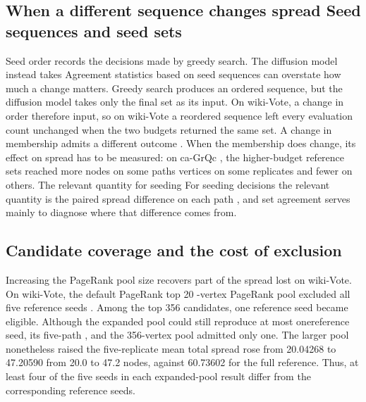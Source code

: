 \documentclass[smallextended]{svjour3}
\providecommand{\DIFaddtex}[1]{{\protect\color{blue} \sf #1}} %
\providecommand{\DIFdeltex}[1]{{\protect\color{red} \scriptsize #1}} %
\providecommand{\DIFaddbegin}{} %
\providecommand{\DIFaddend}{} %
\providecommand{\DIFdelbegin}{} %
\providecommand{\DIFdelend}{} %
\providecommand{\DIFadd}[1]{\texorpdfstring{\DIFaddtex{#1}}{#1}} %
\providecommand{\DIFdel}[1]{\texorpdfstring{\DIFdeltex{#1}}{}} %
\providecommand{\DIFscaledelfig}{0.5}
\newlength{\DIFdelgraphicswidth} %
\newlength{\DIFdelgraphicsheight} %
\providecommand{\DIFaddincludegraphics}[2][]{{\color{blue}\fbox{\DIFOincludegraphics[#1]{#2}}}} %
\providecommand{\DIFdelincludegraphics}[2][]{%
\sbox{\DIFdelgraphicsbox}{\DIFOincludegraphics[#1]{#2}}%
\settoboxwidth{\DIFdelgraphicswidth}{\DIFdelgraphicsbox} %
\settoboxtotalheight{\DIFdelgraphicsheight}{\DIFdelgraphicsbox} %
\scalebox{\DIFscaledelfig}{%
\parbox[b]{\DIFdelgraphicswidth}{\usebox{\DIFdelgraphicsbox}\\[-\baselineskip] \rule{\DIFdelgraphicswidth}{0em}}\llap{\resizebox{\DIFdelgraphicswidth}{\DIFdelgraphicsheight}{%
\setlength{\unitlength}{\DIFdelgraphicswidth}%
\begin{picture}(1,1)%
\thicklines\linethickness{2pt} %
{\color[rgb]{1,0,0}\put(0,0){\framebox(1,1){}}}%
{\color[rgb]{1,0,0}\put(0,0){\line( 1,1){1}}}%
{\color[rgb]{1,0,0}\put(0,1){\line(1,-1){1}}}%
\end{picture}%
}\hspace*{3pt}}} %
} %
\DeclareRobustCommand{\DIFaddbegin}{\DIFOaddbegin \let\includegraphics\DIFaddincludegraphics} %
\DeclareRobustCommand{\DIFaddend}{\DIFOaddend \let\includegraphics\DIFOincludegraphics} %
\DeclareRobustCommand{\DIFdelbegin}{\DIFOdelbegin \let\includegraphics\DIFdelincludegraphics} %
\DeclareRobustCommand{\DIFdelend}{\DIFOaddend \let\includegraphics\DIFOincludegraphics} %
\begin{document}
\subsection{\DIFdelbegin \DIFdel{When a different sequence changes spread}\DIFdelend \DIFaddbegin \DIFadd{Seed sequences and seed sets}\DIFaddend }
\DIFdelbegin \DIFdel{Seed order records the decisions made by greedy search. The diffusion model instead takes }\DIFdelend \DIFaddbegin \DIFadd{Agreement statistics based on seed sequences can overstate how much a change matters. Greedy search produces an ordered sequence, but the diffusion model takes only }\DIFaddend the final set as \DIFdelbegin \DIFdel{its input. On wiki-Vote, a change in order therefore }\DIFdelend \DIFaddbegin \DIFadd{input, so on wiki-Vote a reordered sequence }\DIFaddend left every evaluation count unchanged\DIFdelbegin \DIFdel{when the two budgets returned the same set. A change in membership admits a different outcome}\DIFdelend \DIFaddbegin \DIFadd{. When the membership does change, its effect on spread has to be measured}\DIFaddend : on ca-GrQc\DIFaddbegin \DIFadd{, }\DIFaddend the higher-budget \DIFaddbegin \DIFadd{reference }\DIFaddend sets reached more \DIFdelbegin \DIFdel{nodes on some paths }\DIFdelend \DIFaddbegin \DIFadd{vertices on some replicates }\DIFaddend and fewer on others. \DIFdelbegin \DIFdel{The relevant quantity for seeding }\DIFdelend \DIFaddbegin \DIFadd{For seeding decisions the relevant quantity }\DIFaddend is the paired spread difference\DIFdelbegin \DIFdel{on each path}\DIFdelend \DIFaddbegin \DIFadd{, and set agreement serves mainly to diagnose where that difference comes from}\DIFaddend .

\subsection{Candidate coverage and the cost of exclusion}
\DIFaddbegin \DIFadd{Increasing the PageRank pool size recovers part of the spread lost on wiki-Vote. }\DIFaddend On wiki-Vote, the \DIFdelbegin \DIFdel{default PageRank top 20 }\DIFdelend \DIFaddbegin \DIFadd{20-vertex PageRank pool }\DIFaddend excluded all five reference seeds\DIFdelbegin \DIFdel{. Among the top 356 candidates, one reference seed became eligible. Although the expanded pool could still reproduce at most onereference seed, its five-path }\DIFdelend \DIFaddbegin \DIFadd{, and the 356-vertex pool admitted only one. The larger pool nonetheless raised the five-replicate }\DIFaddend mean total spread \DIFdelbegin \DIFdel{rose from 20.04268 to 47.20590 }\DIFdelend \DIFaddbegin \DIFadd{from 20.0 to 47.2 }\DIFaddend nodes, against \DIFdelbegin \DIFdel{60.73602 }\DIFdelend \DIFaddbegin \DIFadd{60.7 }\DIFaddend for the full reference. \DIFaddbegin \DIFadd{Thus, at least four of the five seeds in each expanded-pool result differ from the corresponding reference seeds.
}\DIFaddend 
\end{document}
